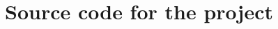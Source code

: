 \documentclass[12pt]{article}
\begin{document}

\section[6]{Source code for the project}


\setcounter{section}{0}
\newpage
\end{document}
